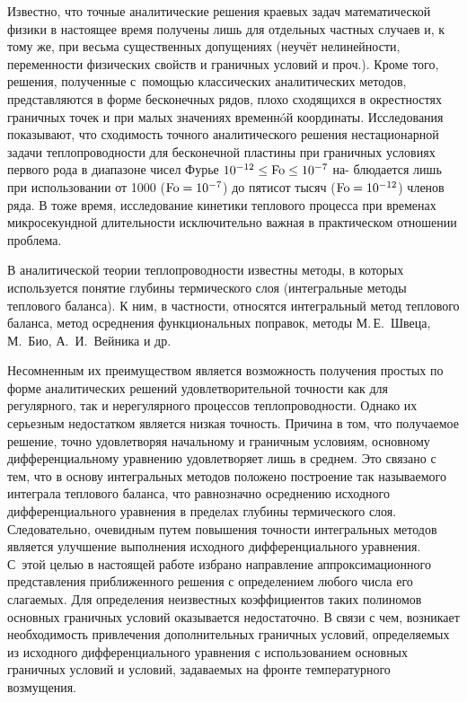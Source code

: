 \smallskip

{
\small
Известно, что точные аналитические решения краевых задач математической
физики в настоящее время получены лишь для отдельных частных случаев и, к тому
же, при весьма существенных допущениях (неучёт нелинейности, переменности 
физических свойств и граничных условий и проч.). Кроме того, решения, полученные 
с~помощью классических аналитических методов, представляются в форме бесконечных
рядов, плохо сходящихся в окрестностях граничных точек и при малых значениях
временн\'oй координаты. Исследования показывают, что сходимость точного аналитического 
решения нестационарной задачи теплопроводности для бесконечной пластины
при граничных условиях первого рода в диапазоне чисел Фурье $10^{-12}\leq \rm  Fo \leq  10^{-7}$ на-
блюдается лишь при использовании от 1000 ($\rm Fo=10^{-7}$) до пятисот тысяч ($\rm Fo=  10^{-12}$)
членов ряда. В тоже время, исследование кинетики теплового процесса при временах
микросекундной длительности исключительно важная в практическом отношении
проблема.

В аналитической теории теплопроводности известны методы, в которых используется понятие глубины термического слоя (интегральные методы теплового баланса).
К ним, в частности, относятся интегральный метод теплового баланса, метод осреднения функциональных поправок, 
методы М.\,Е.~Швеца, М.~Био, А.~И.~Вейника и др.

Несомненным их преимуществом является возможность получения простых по
форме аналитических решений удовлетворительной точности как для регулярного, так
и нерегулярного процессов теплопроводности. Однако их серьезным недостатком является низкая точность. Причина в том, что получаемое решение, точно удовлетворяя
начальному и граничным условиям, основному дифференциальному уравнению удовлетворяет лишь в среднем. Это связано с тем, что в основу интегральных методов положено построение так называемого интеграла теплового баланса, что равнозначно
осреднению исходного дифференциального уравнения в пределах глубины термического слоя. Следовательно, очевидным путем повышения точности интегральных методов является улучшение выполнения исходного дифференциального уравнения. 
С~этой целью в настоящей работе избрано направление аппроксимационного представления приближенного решения с определением любого числа его слагаемых. Для определения неизвестных коэффициентов таких полиномов основных граничных условий оказывается недостаточно. В связи с чем, возникает необходимость привлечения дополнительных граничных условий, определяемых из исходного дифференциального
уравнения с использованием основных граничных условий и условий, задаваемых на
фронте температурного возмущения.

}
